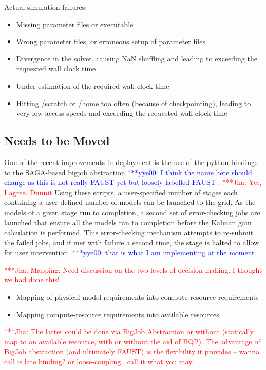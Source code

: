 \documentclass[conference,final]{IEEEtran}
\newcommand{\jhanote}[1]{ {\textcolor{red} { ***Jha: #1 }}}
\newcommand{\yyenote}[1]{ {\textcolor{blue} { ***yye00: #1 }}}
\begin{document}
Actual simulation failures:
\begin{itemize}
\item{Missing parameter files or executable}
\item{Wrong parameter files, or erroneous setup of parameter files}
\item{Divergence in the solver, causing NaN shuffling and leading to exceeding the requested wall clock time}
\item{Under-estimation of the required wall clock time}
\item{Hitting /scratch or /home too often (because of checkpointing), leading to very low access speeds and exceeding the requested wall clock time}
\end{itemize}

\subsection{Needs to be Moved}
One of the recent improvements in deployment is the use of the python
bindings to the SAGA-based bigjob abstraction \yyenote{I think the
  name here should change as this is not really FAUST yet but loosely
  labelled FAUST}. \jhanote{Yes, I agree. Dunnit} Using these scripts,
a user-specified number of stages each containing a user-defined
number of models can be launched to the grid. As the models of a given
stage run to completion, a second set of error-checking jobs are
launched that ensure all the models ran to completion before the
Kalman gain calculation is performed. This error-checking mechanism
attempts to re-submit the failed jobs, and if met with failure a
second time, the stage is halted to allow for user
intervention. \yyenote{that is what I am implementing at the moment}

\jhanote{Mapping: Need discussion on the two-levels of decision
  making. I thought we had done this!}

\begin{itemize}
\item Mapping of physical-model requirements into compute-resource requirements
\item Mapping compute-resource requirements into available resources
\end{itemize}
\jhanote{The latter could be done via BigJob Abstraction or without
  (statically map to an available resource, with or without the aid of
  BQP).  The advantage of BigJob abstraction (and ultimately FAUST) is
  the flexibility it provides -- wanna call is late binding? or
  loose-coupling..  call it what you may.}
\end{document}

